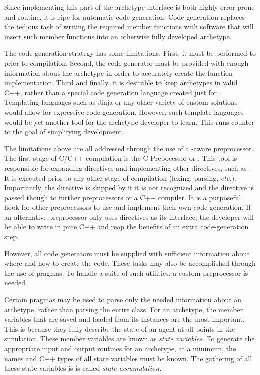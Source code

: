 Since implementing this part of the archetype interface is both highly
error-prone and
routine, it is ripe for automatic code generation. Code generation replaces the
tedious task of writing the required member functions with software that will
insert such member functions into an otherwise fully developed archetype.

The code generation strategy has some limitations.
First, it must be
performed to prior to compilation. Second, the
code generator must be provided with enough information about the archetype in
order to accurately create the function implementation. Third and finally, it
is desirable to keep archetypes in valid C++, rather than a special
code generation language created just for \cyclus.
Templating languages
such as Jinja \cite{ronacher2011jinja2} or any other variety of custom
solutions would allow for
expressive code generation. However, such template languages would be yet another
tool for the archetype developer to learn. This runs counter to the goal of
simplifying development.

The limitations above are all addressed through the use of a
\cyclus-aware preprocessor. The first stage of C/C++ compilation is the
C Prepocessor or  \cite{stallman1987c}. This tool is responsible for expanding
 directives and implementing other \code{#} directives, such as
. It is executed
prior to any other stage of compilation (lexing, parsing, \emph{etc.}).
Importantly, the  directive is skipped by  if it is not
recognized and the directive is passed though to further preprocessors or a C++
compiler. It is a
purposeful hook for other preprocessors to use and implement their own code generation.
If an alternative preprocessor only uses  directives as its interface,
the developer will be able to write in pure C++ and reap the benefits
of an extra code-generation step.

However, all code generators must be supplied with sufficient information about
where and how to create the code. These tasks may also be accomplished through
the use of pragmas. To handle a suite of such utilities, a custom preprocessor
is needed.

Certain pragmas may be used to parse only the needed information
about an archetype, rather than parsing the entire class. For an archetype, the
member variables that are saved and loaded from its instances are the most important.
This is because they fully describe the state of an agent
at all points in the simulation. These member variables are known as \emph{state variables}.
To generate the appropriate input and output routines for an archetype, at a minimum, the names and C++ types
of all state variables must be known. The gathering of all these state variables is is
called \emph{state accumulation}.

